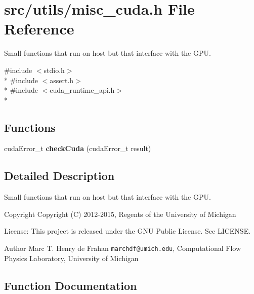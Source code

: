 \section{src/utils/misc\-\_\-cuda.h File Reference}
\label{misc__cuda_8h}


Small functions that run on host but that interface with the G\-P\-U.  


{\ttfamily \#include $<$stdio.\-h$>$}\\*
{\ttfamily \#include $<$assert.\-h$>$}\\*
{\ttfamily \#include $<$cuda\-\_\-runtime\-\_\-api.\-h$>$}\\*
\subsection*{Functions}
\begin{DoxyCompactItemize}
\item 
cuda\-Error\-\_\-t {\bf check\-Cuda} (cuda\-Error\-\_\-t result)
\end{DoxyCompactItemize}


\subsection{Detailed Description}
Small functions that run on host but that interface with the G\-P\-U. \begin{DoxyCopyright}{Copyright}
Copyright (C) 2012-\/2015, Regents of the University of Michigan 
\end{DoxyCopyright}
\begin{DoxyParagraph}{License\-:}
This project is released under the G\-N\-U Public License. See L\-I\-C\-E\-N\-S\-E. 
\end{DoxyParagraph}
\begin{DoxyAuthor}{Author}
Marc T. Henry de Frahan {\tt marchdf@umich.\-edu}, Computational Flow Physics Laboratory, University of Michigan 
\end{DoxyAuthor}


\subsection{Function Documentation}
